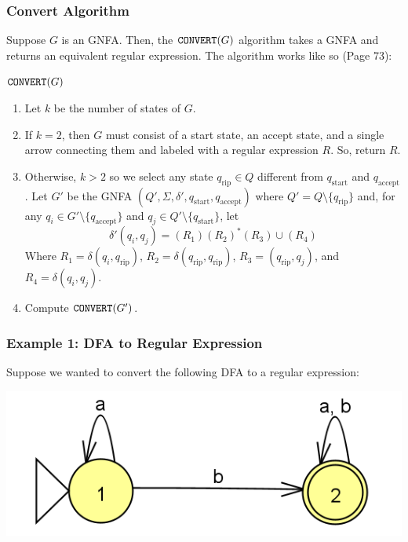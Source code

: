 \documentclass[letterpaper]{article}
\begin{document}
\subsubsection{Convert Algorithm}
Suppose $G$ is an GNFA. Then, the $\texttt{CONVERT}(G)$ algorithm takes a GNFA and returns an equivalent regular expression. The algorithm works like so (Page 73): 
\begin{mdframed}[]
    $\texttt{CONVERT}(G)$
    \begin{enumerate}
        \item Let $k$ be the number of states of $G$. 
        \item If $k = 2$, then $G$ must consist of a start state, an accept state, and a single arrow connecting them and labeled with a regular expression $R$. So, return $R$. 
        \item Otherwise, $k > 2$ so we select any state $q_{\text{rip}} \in Q$ different from $q_{\text{start}}$ and $q_{\text{accept}}$. Let $G'$ be the GNFA $(Q', \Sigma, \delta', q_{\text{start}}, q_{\text{accept}})$ where $Q' = Q \setminus \{q_{\text{rip}}\}$ and, for any $q_i \in G' \setminus \{q_{\text{accept}}\}$ and $q_j \in Q' \setminus \{q_{\text{start}}\}$, let
        \[\delta'(q_i, q_j) = (R_1)(R_2)^* (R_3) \cup (R_4)\]
        Where $R_1 = \delta(q_i, q_{\text{rip}})$, $R_2 = \delta(q_{\text{rip}}, q_{\text{rip}})$, $R_3 = (q_{\text{rip}}, q_j)$, and $R_4 = \delta(q_i, q_j)$. 
        \item Compute $\texttt{CONVERT}(G')$. 
    \end{enumerate}
\end{mdframed}

\subsubsection{Example 1: DFA to Regular Expression}
Suppose we wanted to convert the following DFA to a regular expression:
\begin{center}
    \includegraphics[scale=0.5]{assets/dfa_regex_1.png}
\end{center}
\end{document}
